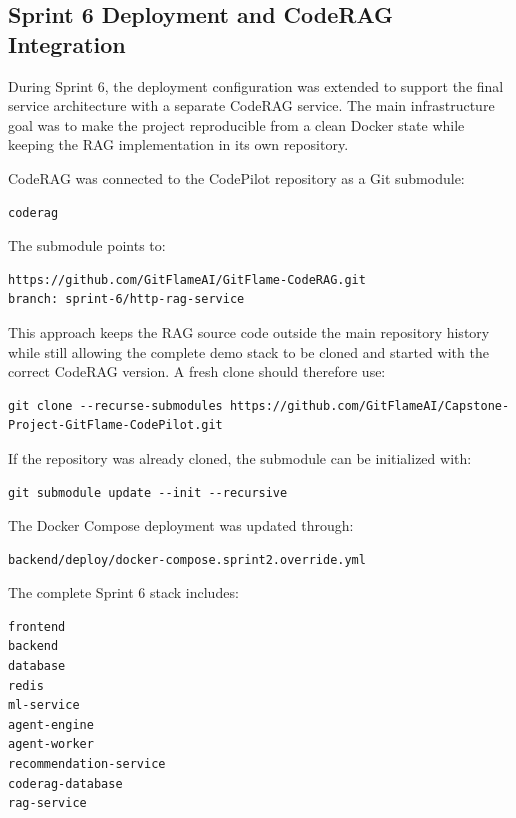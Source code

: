 \subsection{Sprint 6 Deployment and CodeRAG Integration}

During Sprint 6, the deployment configuration was extended to support the final
service architecture with a separate CodeRAG service. The main infrastructure goal
was to make the project reproducible from a clean Docker state while keeping the
RAG implementation in its own repository.

CodeRAG was connected to the CodePilot repository as a Git submodule:

\begin{verbatim}
coderag
\end{verbatim}

The submodule points to:

\begin{verbatim}
https://github.com/GitFlameAI/GitFlame-CodeRAG.git
branch: sprint-6/http-rag-service
\end{verbatim}

This approach keeps the RAG source code outside the main repository history while
still allowing the complete demo stack to be cloned and started with the correct
CodeRAG version. A fresh clone should therefore use:

\begin{verbatim}
git clone --recurse-submodules https://github.com/GitFlameAI/Capstone-Project-GitFlame-CodePilot.git
\end{verbatim}

If the repository was already cloned, the submodule can be initialized with:

\begin{verbatim}
git submodule update --init --recursive
\end{verbatim}

The Docker Compose deployment was updated through:

\begin{verbatim}
backend/deploy/docker-compose.sprint2.override.yml
\end{verbatim}

The complete Sprint 6 stack includes:

\begin{verbatim}
frontend
backend
database
redis
ml-service
agent-engine
agent-worker
recommendation-service
coderag-database
rag-service
\end{verbatim}

